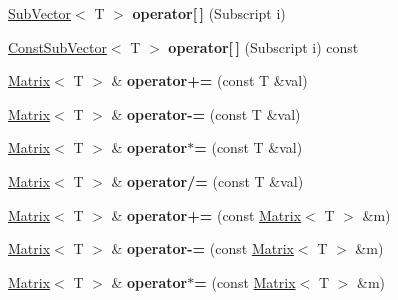 \begin{DoxyCompactItemize}
\item 
\mbox{\label{classTLAS_1_1Matrix_a02f998004764c4189d7334a91accb482}} 
\hyperlink{classTLAS_1_1SubVector}{Sub\+Vector}$<$ T $>$ {\bfseries operator\mbox{[}$\,$\mbox{]}} (Subscript i)
\item 
\mbox{\label{classTLAS_1_1Matrix_ae54f4d00e34406ff3985e3b1523f3b2d}} 
\hyperlink{classTLAS_1_1ConstSubVector}{Const\+Sub\+Vector}$<$ T $>$ {\bfseries operator\mbox{[}$\,$\mbox{]}} (Subscript i) const
\item 
\mbox{\label{classTLAS_1_1Matrix_adf8e6f071a7fd9b5800759a77d686656}} 
\hyperlink{classTLAS_1_1Matrix}{Matrix}$<$ T $>$ \& {\bfseries operator+=} (const T \&val)
\item 
\mbox{\label{classTLAS_1_1Matrix_a372250f97e0f731c4a080e745f492fde}} 
\hyperlink{classTLAS_1_1Matrix}{Matrix}$<$ T $>$ \& {\bfseries operator-\/=} (const T \&val)
\item 
\mbox{\label{classTLAS_1_1Matrix_a72ab7f8f54003721c65d004caf63f123}} 
\hyperlink{classTLAS_1_1Matrix}{Matrix}$<$ T $>$ \& {\bfseries operator$\ast$=} (const T \&val)
\item 
\mbox{\label{classTLAS_1_1Matrix_ab3c2f25953ab13ad88c741162eb2d1be}} 
\hyperlink{classTLAS_1_1Matrix}{Matrix}$<$ T $>$ \& {\bfseries operator/=} (const T \&val)
\item 
\mbox{\label{classTLAS_1_1Matrix_a536fd2825459691853fe4cf5f0b81925}} 
\hyperlink{classTLAS_1_1Matrix}{Matrix}$<$ T $>$ \& {\bfseries operator+=} (const \hyperlink{classTLAS_1_1Matrix}{Matrix}$<$ T $>$ \&m)
\item 
\mbox{\label{classTLAS_1_1Matrix_aeb7d19ee6dfcd243403c1a37acb02b96}} 
\hyperlink{classTLAS_1_1Matrix}{Matrix}$<$ T $>$ \& {\bfseries operator-\/=} (const \hyperlink{classTLAS_1_1Matrix}{Matrix}$<$ T $>$ \&m)
\item 
\mbox{\label{classTLAS_1_1Matrix_a76fb60360dc1fabe4fd987327e568ce9}} 
\hyperlink{classTLAS_1_1Matrix}{Matrix}$<$ T $>$ \& {\bfseries operator$\ast$=} (const \hyperlink{classTLAS_1_1Matrix}{Matrix}$<$ T $>$ \&m)

\end{DoxyCompactItemize}
